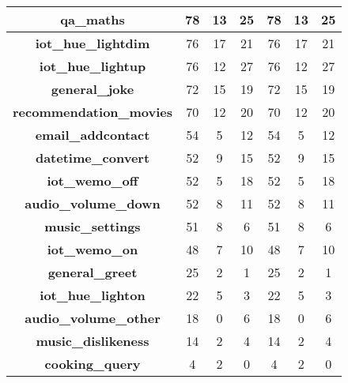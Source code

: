 \begin{table}[]
{\begin{tabular}{|c||c|c|c|c|c|c|}
  \textbf{qa\_maths}& 78 & 13 & 25 & 78 & 13 & 25\\ \hline
  \textbf{iot\_hue\_lightdim}& 76 & 17 & 21 & 76 & 17 & 21\\ \hline
  \textbf{iot\_hue\_lightup}& 76 & 12 & 27 & 76 & 12 & 27\\ \hline
  \textbf{general\_joke}& 72 & 15 & 19 & 72 & 15 & 19\\ \hline
  \textbf{recommendation\_movies}& 70 & 12 & 20 & 70 & 12 & 20\\ \hline
  \textbf{email\_addcontact}& 54 & 5 & 12 & 54 & 5 & 12\\ \hline
  \textbf{datetime\_convert}& 52 & 9 & 15 & 52 & 9 & 15\\ \hline
  \textbf{iot\_wemo\_off}& 52 & 5 & 18 & 52 & 5 & 18\\ \hline
  \textbf{audio\_volume\_down}& 52 & 8 & 11 & 52 & 8 & 11\\ \hline
  \textbf{music\_settings}& 51 & 8 & 6 & 51 & 8 & 6\\ \hline
  \textbf{iot\_wemo\_on}& 48 & 7 & 10 & 48 & 7 & 10\\ \hline
  \textbf{general\_greet}& 25 & 2 & 1 & 25 & 2 & 1\\ \hline
  \textbf{iot\_hue\_lighton}& 22 & 5 & 3 & 22 & 5 & 3\\ \hline
  \textbf{audio\_volume\_other}& 18 & 0 & 6 & 18 & 0 & 6\\ \hline
  \textbf{music\_dislikeness}& 14 & 2 & 4 & 14 & 2 & 4\\ \hline
  \textbf{cooking\_query}& 4 & 2 & 0 & 4 & 2 & 0\\ \hline 
\end{tabular}
}
\end{table}


